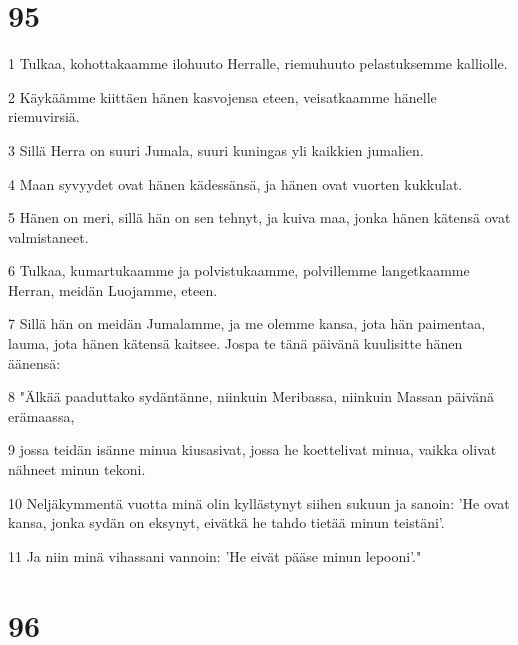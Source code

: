 \chapter{95}

\par 1 Tulkaa, kohottakaamme ilohuuto Herralle, riemuhuuto pelastuksemme kalliolle.
\par 2 Käykäämme kiittäen hänen kasvojensa eteen, veisatkaamme hänelle riemuvirsiä.
\par 3 Sillä Herra on suuri Jumala, suuri kuningas yli kaikkien jumalien.
\par 4 Maan syvyydet ovat hänen kädessänsä, ja hänen ovat vuorten kukkulat.
\par 5 Hänen on meri, sillä hän on sen tehnyt, ja kuiva maa, jonka hänen kätensä ovat valmistaneet.
\par 6 Tulkaa, kumartukaamme ja polvistukaamme, polvillemme langetkaamme Herran, meidän Luojamme, eteen.
\par 7 Sillä hän on meidän Jumalamme, ja me olemme kansa, jota hän paimentaa, lauma, jota hänen kätensä kaitsee. Jospa te tänä päivänä kuulisitte hänen äänensä:
\par 8 "Älkää paaduttako sydäntänne, niinkuin Meribassa, niinkuin Massan päivänä erämaassa,
\par 9 jossa teidän isänne minua kiusasivat, jossa he koettelivat minua, vaikka olivat nähneet minun tekoni.
\par 10 Neljäkymmentä vuotta minä olin kyllästynyt siihen sukuun ja sanoin: 'He ovat kansa, jonka sydän on eksynyt, eivätkä he tahdo tietää minun teistäni'.
\par 11 Ja niin minä vihassani vannoin: 'He eivät pääse minun lepooni'."

\chapter{96}

